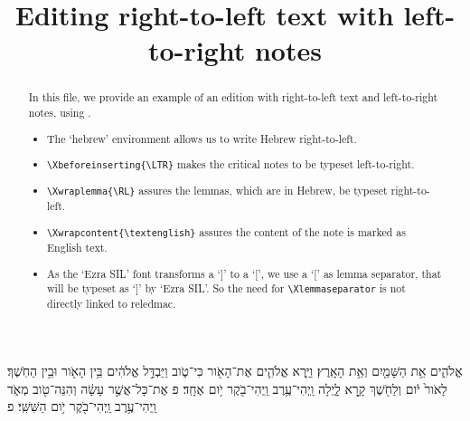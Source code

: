 \documentclass{article}
\title{Editing right-to-left text with left-to-right notes}
\date{}
\newenvironment{hebrew}[2][]{\begin{otherlanguage}{hebrew}}{\end{otherlanguage}}
\begin{document}
\maketitle
\begin{abstract}


In this file, we provide an example of an edition with right-to-left text and left-to-right notes, using \XeLaTeX.

\begin{itemize}
	\item The `hebrew' environment allows us to write Hebrew right-to-left.
	\item \verb+\Xbeforeinserting{\LTR}+ makes the critical notes to be typeset left-to-right.
	\item \verb+\Xwraplemma{\RL}+ assures the lemmas, which are in Hebrew, be typeset right-to-left.
	\item \verb+\Xwrapcontent{\textenglish}+ assures the content of the note is marked as English text. 
	\item As the `Ezra SIL' font transforms a `]' to a `[', we use a `[' as lemma separator, that will be typeset as `]' by `Ezra SIL'. So the need for \verb+\Xlemmaseparator+ is not directly linked to reledmac.
\end{itemize}

\end{abstract}

\begin{hebrew}
\beginnumbering


\pstart
{} 
אֱלֹהִ֑ים אֵ֥ת הַשָּׁמַ֖יִם וְאֵ֥ת הָאָֽרֶץ׃
וַיַּ֧רְא אֱלֹהִ֛ים אֶת־הָאֹ֖ור כִּי־טֹ֑וב וַיַּבְדֵּ֣ל אֱלֹהִ֔ים בֵּ֥ין הָאֹ֖ור וּבֵ֥ין הַחֹֽשֶׁךְ׃
 לָאֹור֙ יֹ֔ום וְלַחֹ֖שֶׁךְ קָ֣רָא לָ֑יְלָה וַֽיְהִי־עֶ֥רֶב וַֽיְהִי־בֹ֖קֶר יֹ֥ום אֶחָֽד׃ פ
 אֶת־כָּל־אֲשֶׁ֣ר עָשָׂ֔ה וְהִנֵּה־טֹ֖וב מְאֹ֑ד וַֽיְהִי־עֶ֥רֶב וַֽיְהִי־בֹ֖קֶר יֹ֥ום הַשִּׁשִּֽׁי׃ פ

\pend
\endnumbering

\end{hebrew}
\end{document}
